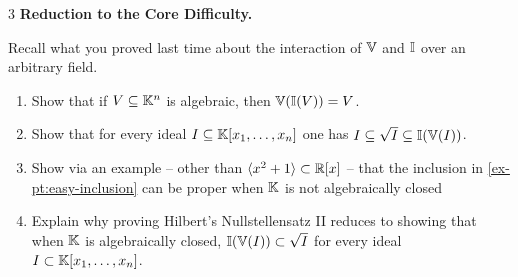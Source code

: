 \documentclass[Notebook.tex]{subfiles}
\begin{document}
\newpage 

\begin{problem}{3}
    \textbf{Reduction to the Core Difficulty.} 
    
    Recall what you proved last time about the interaction of $\mathbb V$ and $\mathbb I$ over an arbitrary field.
    \begin{enumerate}
    \item Show that if $V\subseteq \mathbb K^n$ is algebraic, then $\mathbb V(\mathbb I(V))=V$.
    \item\label{ex-pt:easy-inclusion} Show that for every ideal $I \subseteq \mathbb K[x_1,\ldots,x_n]$ one has $I \subseteq \sqrt{I} \subseteq \mathbb I(\mathbb V(I))$.
    \item Show via an example -- other than $\langle x^2+1\rangle \subset \mathbb R[x]$ -- that the inclusion in \ref{ex-pt:easy-inclusion} can be proper when $\mathbb K$ is not algebraically closed 
    \item Explain why proving Hilbert's Nullstellensatz II reduces to showing that when $\mathbb K$ is algebraically closed, $\mathbb I(\mathbb V(I)) \subset \sqrt{I}$ for every ideal $I \subset \mathbb K[x_1,\ldots,x_n]$.
    \end{enumerate}
\end{problem}
\end{document}
